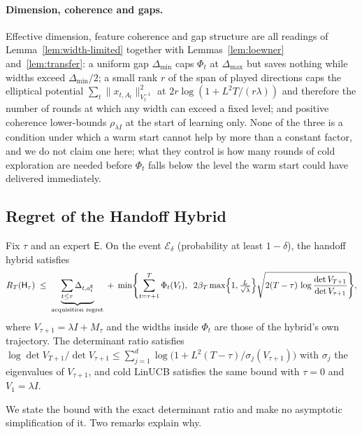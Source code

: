 \documentclass[anon]{alt2027} %
\newcommand{\Exp}{\mathsf{E}}
\newcommand{\Hyb}{\mathsf{H}}
\begin{document}
\paragraph{Dimension, coherence and gaps.}
Effective dimension, feature coherence and gap structure are all readings of
Lemma~\ref{lem:width-limited} together with Lemmas~\ref{lem:loewner}
and~\ref{lem:transfer}: a uniform gap $\Delta_{\min}$ caps $\Phi_t$ at
$\Delta_{\max}$ but saves nothing while widths exceed $\Delta_{\min}/2$; a small
rank $r$ of the span of played directions caps the elliptical potential
$\sum_t\|x_{t,A_t}\|^2_{V_t^{-1}}$ at $2r\log(1+L^2T/(r\lambda))$ and therefore
the number of rounds at which any width can exceed a fixed level; and positive
coherence lower-bounds $\rho_{\lambda I}$ at the start of learning only. None
of the three is a condition under which a warm start cannot help by more than
a constant factor, and we do not claim one here; what they control is how
many rounds of cold exploration are needed before $\Phi_t$ falls below the
level the warm start could have delivered immediately.


\subsection{Regret of the Handoff Hybrid}
\label{sec:handoff}

\begin{proposition}
\label{thm:handoff}
Fix $\tau$ and an expert $\Exp$. On the event $\mathcal E_\delta$ (probability
at least $1-\delta$), the handoff hybrid satisfies
\begin{equation}
\label{eq:handoff-bound}
R_T(\Hyb_\tau)\;\le\;
\underbrace{\sum_{t\le\tau}\Delta_{t,a_t^{\Exp}}}_{\text{acquisition regret}}
\;+\;
\min\Biggl\{\sum_{t=\tau+1}^{T}\Phi_t(V_t),\;\;
2\beta_T\max\Bigl\{1,\tfrac{L}{\sqrt\lambda}\Bigr\}\sqrt{2(T-\tau)\,\log\frac{\det V_{T+1}}{\det V_{\tau+1}}}\Biggr\},
\end{equation}
where $V_{\tau+1}=\lambda I+M_\tau$ and the widths inside $\Phi_t$ are those
of the hybrid's own trajectory. The determinant ratio satisfies
$\log\det V_{T+1}/\det V_{\tau+1}\le\sum_{j=1}^{d}\log\bigl(1+L^2(T-\tau)/\sigma_j(V_{\tau+1})\bigr)$
with $\sigma_j$ the eigenvalues of $V_{\tau+1}$, and cold LinUCB satisfies the
same bound with $\tau=0$ and $V_1=\lambda I$.
\end{proposition}

We state the bound with the exact determinant ratio and make no asymptotic
simplification of it. Two remarks explain why.
\end{document}
